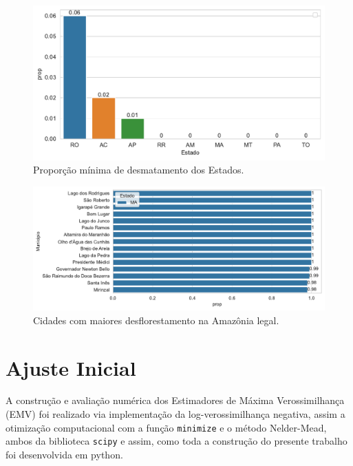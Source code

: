 \documentclass[
]{article}
\begin{document}
\begin{figure}[H]

{\centering \includegraphics{report_files/figure-pdf/fig-states-min-output-1.pdf}

}

\caption{\label{fig-states-min}Proporção mínima de desmatamento dos
Estados.}

\end{figure}

\begin{figure}[H]

{\centering \includegraphics{report_files/figure-pdf/fig-city-output-1.pdf}

}

\caption{\label{fig-city}Cidades com maiores desflorestamento na
Amazônia legal.}

\end{figure}

\section{Ajuste Inicial}

A construção e avaliação numérica dos Estimadores de Máxima
Verossimilhança (EMV) foi realizado via implementação da
log-verossimilhança negativa, assim a otimização computacional com a
função \texttt{minimize} e o método Nelder-Mead, ambos da biblioteca
\texttt{scipy} e assim, como toda a construção do presente trabalho foi
desenvolvida em python.
\end{document}
